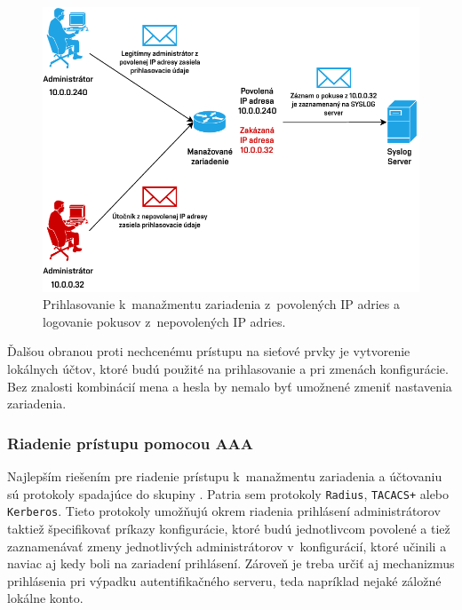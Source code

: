 \begin{figure}[H]
	\begin{center}
		\includegraphics[scale=1]{obrazky/login-log.pdf}
	\end{center}
	\caption[Prihlasovanie k~manažmentu zariadenia]{Prihlasovanie k~manažmentu zariadenia z~povolených IP adries a logovanie pokusov z~nepovolených IP adries.}
	\label{fig:login-log-mngmt}
\end{figure} 

\newpage
Ďalšou obranou proti nechcenému prístupu na sieťové prvky je vytvorenie lokálnych účtov, ktoré budú použité na prihlasovanie a pri zmenách konfigurácie. Bez znalosti kombinácií mena a hesla by nemalo byť umožnené zmeniť nastavenia zariadenia.  

\subsubsection{Riadenie prístupu pomocou AAA}
Najlepším riešením pre riadenie prístupu k~manažmentu zariadenia a účtovaniu sú protokoly spadajúce do skupiny . Patria sem protokoly \texttt{Radius}, \texttt{TACACS+} alebo \texttt{Kerberos}. Tieto protokoly umožňujú okrem riadenia prihlásení administrátorov taktiež špecifikovať príkazy konfigurácie, ktoré budú jednotlivcom povolené a tiež zaznamenávať zmeny jednotlivých administrátorov v~konfigurácií, ktoré učinili a naviac aj kedy boli na zariadení prihlásení. Zároveň je treba určiť aj mechanizmus prihlásenia pri výpadku autentifikačného serveru, teda napríklad nejaké záložné lokálne konto.

